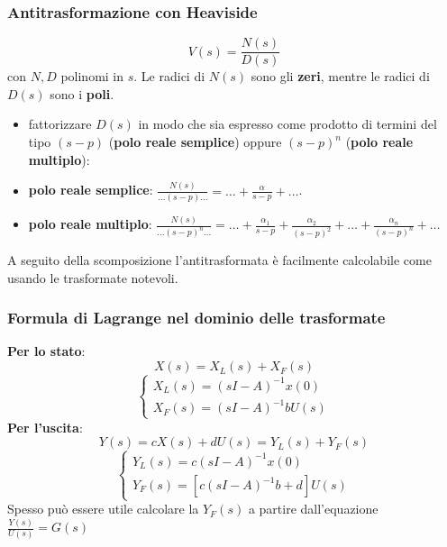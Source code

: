 \begin{landscape}
    \subsubsection*{Antitrasformazione con Heaviside}
    \[
        V(s) = \frac{N(s)}{D(s)}
    \]
    con $N,D$ polinomi in $s$.\newline
    Le radici di $N(s)$ sono gli \textbf{zeri}, mentre le radici di $D(s)$ sono i \textbf{poli}.\newline
    \begin{itemize}
        \item fattorizzare $D(s)$ in modo che sia espresso come prodotto di termini del tipo $(s-p)$ (\textbf{polo reale semplice}) oppure $(s-p)^n$ (\textbf{polo reale multiplo}):
        \item \textbf{polo reale semplice}: $\frac{N(s)}{\dots(s-p)\dots} = \dots + \frac{\alpha}{s-p} + \dots$.
        \item \textbf{polo reale multiplo}: $\frac{N(s)}{\dots (s-p)^n \dots} = \dots + \frac{\alpha_1}{s-p} + \frac{\alpha_2}{(s-p)^2} + \dots + \frac{\alpha_n}{(s-p)^n} + \dots$
    \end{itemize}
    A seguito della scomposizione l'antitrasformata è facilmente calcolabile come usando le trasformate notevoli.
    \subsubsection*{Formula di Lagrange nel dominio delle trasformate}
    \textbf{Per lo stato}:
    \[
        X(s) = X_L(s) + X_F(s)
    \]
    \[
        \begin{cases}
            X_L(s) = (sI-A)^{-1} x(0)\\
            X_F(s) = (sI-A) ^{-1} b U(s)
        \end{cases}
    \]
    \textbf{Per l'uscita}:
    \[
        Y(s) = cX(s) + dU(s) = Y_L(s) + Y_F(s)
    \]
    \[
        \begin{cases}
            Y_L(s) = c(sI-A)^{-1} x(0)\\
            Y_F(s) = [c(sI-A)^{-1} b + d]U(s)
        \end{cases}
    \]
    Spesso può essere utile calcolare la $Y_F(s)$ a partire dall'equazione $\frac{Y(s)}{U(s)} = G(s)$

\end{landscape}
